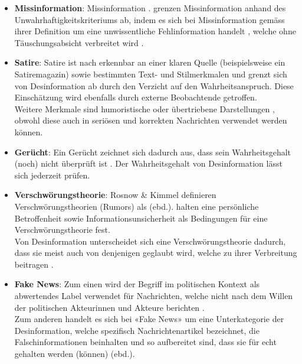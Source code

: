 \documentclass[12pt,a4paper]{article}        %
\begin{document}
\begin{itemize}
  \item \textbf{Missinformation}: Missinformation  \parencite[2]{bontridder_role_2021}. \citeauthor{marx_fake_2020} grenzen Missinformation anhand des Unwahrhaftigkeitskriteriums ab, indem es sich bei Missinformation gemäss ihrer Definition um eine unwissentliche Fehlinformation handelt \parencite[156]{marx_fake_2020}, welche ohne Täuschungsabsicht verbreitet wird \parencite[vgl.\ auch][15]{grujic_warnhinweise_2024}.
  \item \textbf{Satire}: Satire ist nach \textcite[154]{marx_fake_2020} erkennbar an einer klaren Quelle (beispielsweise ein Satiremagazin) sowie bestimmten Text- und Stilmerkmalen und grenzt sich von Desinformation ab durch den Verzicht auf den Wahrheitsanspruch. Diese Einschätzung wird ebenfalls durch externe Beobachtende getroffen.\\
  Weitere Merkmale sind humoristische oder übertriebene Darstellungen \parencites[141]{tandoc_jr_defining_2018}[2]{khan_fake_2021}, obwohl diese auch in seriösen und korrekten Nachrichten verwendet werden können.
  \item \textbf{Gerücht}: Ein Gerücht zeichnet sich dadurch aus, dass sein Wahrheitsgehalt (noch) nicht überprüft ist \parencite[155]{marx_fake_2020}. Der Wahrheitsgehalt von Desinformation lässt sich jederzeit prüfen.
  \item \textbf{Verschwörungstheorie}: Rosnow \& Kimmel \parencite[zit.\ nach][197]{krafft_disinformation_2020} definieren Verschwörungstheorien (Rumors) als  (ebd.). \textcite[197]{krafft_disinformation_2020} halten eine persönliche Betroffenheit sowie Informationsunsicherheit als Bedingungen für eine Verschwörungstheorie fest.\\
  Von Desinformation unterscheidet sich eine Verschwörungstheorie dadurch, dass sie meist auch von denjenigen geglaubt wird, welche zu ihrer Verbreitung beitragen \parencite[156]{marx_fake_2020}.
  \item \textbf{Fake News}: Zum einen wird der Begriff im politischen Kontext als abwertendes Label verwendet für Nachrichten, welche nicht nach dem Willen der politischen Akteurinnen und Akteure berichten \parencite[3]{tandoc_jr_facts_2019}.\\
  Zum anderen handelt es sich bei «Fake News» um eine Unterkategorie der Desinformation, welche spezifisch Nachrichtenartikel bezeichnet, die Falschinformationen beinhalten und so aufbereitet sind, dass sie für echt gehalten werden (können) (ebd.).
\end{itemize}
\end{document}
